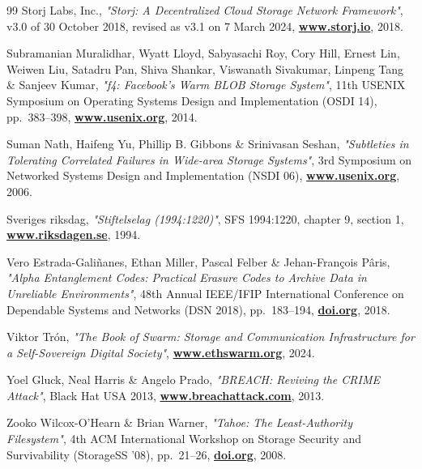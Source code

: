 \documentclass[10pt,a4paper,final]{article}
\let\oldhref\href
\renewcommand{\href}[2]{\oldhref{#1}{\bfseries#2}}
\begin{document}
\begin{thebibliography}{99}
	Storj Labs, Inc.,
	\emph{"Storj: A Decentralized Cloud Storage Network Framework"},
	v3.0 of 30 October 2018, revised as v3.1 on 7 March 2024,
	\href{https://www.storj.io/storjv3.pdf}{www.storj.io},
	2018.

	Subramanian Muralidhar, Wyatt Lloyd, Sabyasachi Roy, Cory Hill, Ernest Lin, Weiwen Liu, Satadru Pan, Shiva Shankar, Viswanath Sivakumar, Linpeng Tang \& Sanjeev Kumar,
	\emph{"f4: Facebook's Warm BLOB Storage System"},
	11th USENIX Symposium on Operating Systems Design and Implementation (OSDI 14), pp.~383--398,
	\href{https://www.usenix.org/conference/osdi14/technical-sessions/presentation/muralidhar}{www.usenix.org},
	2014.

	Suman Nath, Haifeng Yu, Phillip B. Gibbons \& Srinivasan Seshan,
	\emph{"Subtleties in Tolerating Correlated Failures in Wide-area Storage Systems"},
	3rd Symposium on Networked Systems Design and Implementation (NSDI 06),
	\href{https://www.usenix.org/conference/nsdi-06/subtleties-tolerating-correlated-failures-wide-area-storage-systems}{www.usenix.org},
	2006.

	Sveriges riksdag,
	\emph{"Stiftelselag (1994:1220)"},
	SFS 1994:1220, chapter 9, section 1,
	\href{https://www.riksdagen.se/sv/dokument-och-lagar/dokument/svensk-forfattningssamling/stiftelselag-19941220_sfs-1994-1220/}{www.riksdagen.se},
	1994.

	Vero Estrada-Gali\~{n}anes, Ethan Miller, Pascal Felber \& Jehan-Fran\c{c}ois P\^{a}ris,
	\emph{"Alpha Entanglement Codes: Practical Erasure Codes to Archive Data in Unreliable Environments"},
	48th Annual IEEE/IFIP International Conference on Dependable Systems and Networks (DSN 2018), pp.~183--194,
	\href{https://doi.org/10.1109/DSN.2018.00030}{doi.org},
	2018.

	Viktor Tr\'{o}n,
	\emph{"The Book of Swarm: Storage and Communication Infrastructure for a Self-Sovereign Digital Society"},
	\href{https://www.ethswarm.org/The-Book-of-Swarm.pdf}{www.ethswarm.org},
	2024.

	Yoel Gluck, Neal Harris \& Angelo Prado,
	\emph{"BREACH: Reviving the CRIME Attack"},
	Black Hat USA 2013,
	\href{https://www.breachattack.com/}{www.breachattack.com},
	2013.

	Zooko Wilcox-O'Hearn \& Brian Warner,
	\emph{"Tahoe: The Least-Authority Filesystem"},
	4th ACM International Workshop on Storage Security and Survivability (StorageSS '08), pp.~21--26,
	\href{https://doi.org/10.1145/1456469.1456474}{doi.org},
	2008.

\end{thebibliography}
\end{document}
